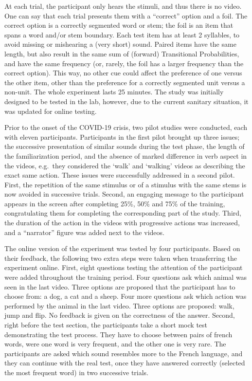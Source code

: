 \documentclass[
  american,
  ,man,floatsintext]{apa6}
\begin{document}
At each trial, the participant only hears the stimuli, and thus there is no video. One can say that each trial presents them with a ``correct'' option and a foil. The correct option is a correctly segmented word or stem; the foil is an item that spans a word and/or stem boundary. Each test item has at least 2 syllables, to avoid missing or mishearing a (very short) sound. Paired items have the same length, but also result in the same sum of (forward) Transitional Probabilities, and have the same frequency (or, rarely, the foil has a larger frequency than the correct option). This way, no other cue could affect the preference of one versus the other item, other than the preference for a correctly segmented unit versus a non-unit. The whole experiment lasts 25 minutes. The study was initially designed to be tested in the lab, however, due to the current sanitary situation, it was updated for online testing.

Prior to the onset of the COVID-19 crisis, two pilot studies were conducted, each with eleven participants. Participants in the first pilot brought up three issues; the successive presentation of similar sounds during the test phase, the length of the familiarization period, and the absence of marked difference in verb aspect in the videos, e.g.~they considered the `walk' and `walking' videos as describing the exact same action. These issues were successfully addressed in a second pilot. First, the repetition of the same stimulus or of a stimulus with the same stems is now avoided in successive trials. Second, an engaging message to the participant appears in the screen after completing 25\%, 50\% and 75\% of the training, congratulating them for completing the corresponding part of the study. Third, the duration of the action in the videos with progressive actions was increased, and a ``narrator'' figure was added next to the videos.

The online version of the experiment was tested by four participants. Based on their feedback, the following two extra steps were taken when transferring the experiment online. First, eight questions testing the attention of the participant were added throughout the training period. Four questions ask which animal was seen in the last video. Three options are proposed that the participant has to choose from: a dog, a cat and a sheep. Four more questions ask which action was performed by the animal in the last video. Three options are proposed: walk, jump and flip. No feedback is given on the correctness of the answer. Second, right before the test section, the participants take a short mock test demonstrating the test process. They have to choose between pairs of french words, were one word is very frequent, and the other one is very rare. The participants are asked which sound resembles more to the French language, and they can continue with the real test, once they have answered correctly (selected the most frequent word) in two successive trials.
\end{document}
